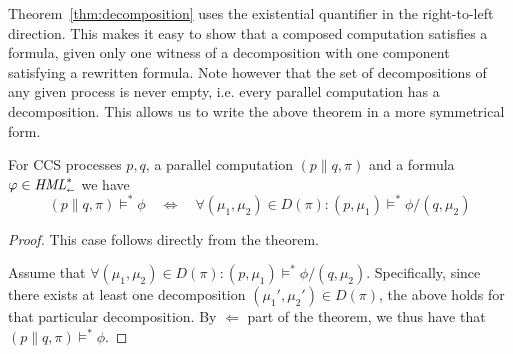 Theorem~\ref{thm:decomposition} uses the existential quantifier in the right-to-left
direction. This makes it easy to show that a composed computation satisfies a
formula, given only one witness of a decomposition with one component satisfying
a rewritten formula. Note however that the set of decompositions of any given
process is never empty, i.e. every parallel computation has a decomposition.
This allows us to write the above theorem in a more symmetrical form.
\begin{corollary}
    For CCS processes $p,q$, a parallel computation $(p \parallel q, \pi)$
    and a formula $\varphi \in \textit{HML}_\shortleftarrow^*$ we have
    \begin{equation}\label{eq:decomp_bi}
        (p\parallel q, \pi) \vDash^* \phi  \quad\Leftrightarrow\quad
        \forall (\mu_1,\mu_2) \in D(\pi) : (p, \mu_1) \vDash^* \phi/(q, \mu_2)
    \end{equation}
\end{corollary}
\begin{proof}
    \ltr This case follows directly from the theorem.
    
    \rtl Assume that $\forall (\mu_1,\mu_2) \in D(\pi) : (p, \mu_1) \vDash^* \phi/(q, \mu_2)$.
    Specifically, since there exists at least one decomposition $(\mu_1',\mu_2')\in D(\pi)$,
    the above holds for that particular decomposition. By $\Leftarrow$ part of the
    theorem, we thus have that \mbox{$(p\parallel q,\pi)\vDash^*\phi$}.
\end{proof}
